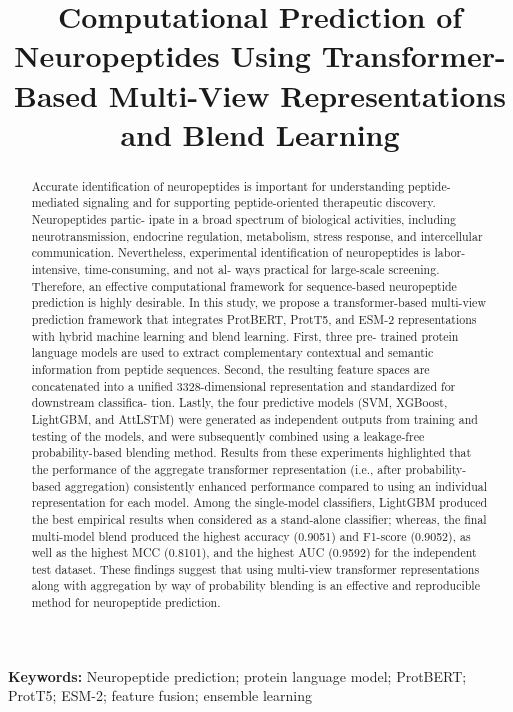 \documentclass[11pt]{article}
\title{Computational Prediction of Neuropeptides Using Transformer-Based Multi-View Representations and Blend Learning}
\author{}
\date{}
\begin{document}
\maketitle

\begin{abstract}
Accurate identification of neuropeptides is important for understanding peptide-mediated signaling and for supporting peptide-oriented therapeutic discovery. Neuropeptides partic- ipate in a broad spectrum of biological activities, including neurotransmission, endocrine regulation, metabolism, stress response, and intercellular communication. Nevertheless, experimental identification of neuropeptides is labor-intensive, time-consuming, and not al- ways practical for large-scale screening. Therefore, an effective computational framework for sequence-based neuropeptide prediction is highly desirable. In this study, we propose a transformer-based multi-view prediction framework that integrates ProtBERT, ProtT5, and ESM-2 representations with hybrid machine learning and blend learning. First, three pre- trained protein language models are used to extract complementary contextual and semantic information from peptide sequences. Second, the resulting feature spaces are concatenated into a unified 3328-dimensional representation and standardized for downstream classifica- tion. Lastly, the four predictive models (SVM, XGBoost, LightGBM, and AttLSTM) were generated as independent outputs from training and testing of the models, and were subsequently combined using a leakage-free probability-based blending method. Results from these experiments highlighted that the performance of the aggregate transformer representation (i.e., after probability-based aggregation) consistently enhanced performance compared to using an individual representation for each model. Among the single-model classifiers, LightGBM produced the best empirical results when considered as a stand-alone classifier; whereas, the final multi-model blend produced the highest accuracy (0.9051) and F1-score (0.9052), as well as the highest MCC (0.8101), and the highest AUC (0.9592) for the independent test dataset. These findings suggest that using multi-view transformer representations along with aggregation by way of probability blending is an effective and reproducible method for neuropeptide prediction.
\end{abstract}

\noindent\textbf{Keywords:} Neuropeptide prediction; protein language model; ProtBERT; ProtT5; ESM-2; feature fusion; ensemble learning
\end{document}
